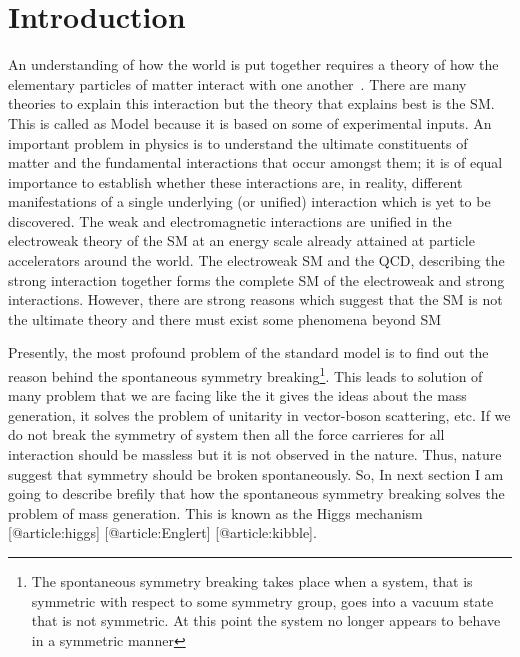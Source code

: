 \chapter{Introduction}
An understanding of how the world is put together requires a theory of how the elementary particles of matter interact with one another~\cite{Hooft1980}. There are many theories to explain this interaction but the theory that explains best is the SM. This is called as Model because it is based on some of experimental inputs. An important problem in physics is to understand the ultimate constituents of matter and the fundamental interactions that occur amongst them; it is of equal importance to establish whether these interactions are, in reality, different manifestations of a single underlying (or unified) interaction which is yet to be discovered. The weak and electromagnetic interactions are unified in the electroweak theory of the SM at an energy scale already attained at particle accelerators around the world. The electroweak SM and the QCD, describing the strong interaction together forms the complete SM of the electroweak and strong interactions. However, there are strong reasons which suggest that the SM is not the ultimate theory and there must exist some phenomena beyond SM \cite{Quigg1985,article:PAdventure}


Presently, the most profound problem of the standard model is to find out the reason behind the spontaneous symmetry breaking\footnote{The spontaneous symmetry breaking takes place when a system, that is symmetric with respect to some symmetry group, goes into a vacuum state that is not symmetric. At this point the system no longer appears to behave in a symmetric manner}. This leads to solution of many problem that we are facing like the it gives the ideas about the mass generation, it solves the problem of unitarity in vector-boson scattering, etc. If we do not break the symmetry of system then all the force carrieres for all interaction should be massless but it is not observed in the nature. Thus, nature suggest that symmetry should be broken spontaneously. So, In next section I am going to describe brefily that how the spontaneous symmetry breaking solves the problem of mass generation. This is known as the Higgs mechanism [@article:higgs] [@article:Englert] [@article:kibble].







